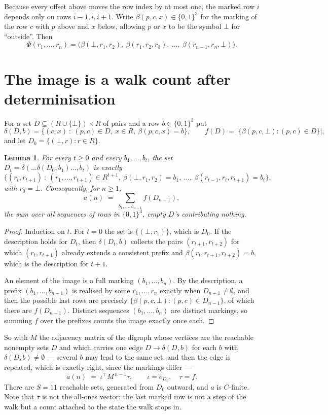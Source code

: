 \documentclass[11pt,a4paper]{article}
\theoremstyle{plain}
\newtheorem{lemma}[theorem]{Lemma}
\theoremstyle{definition}
\begin{document}
Because every offset above moves the row index by at most one, the marked row $i$ depends only
on rows $i-1,i,i+1$. Write $\beta(p,c,x)\in\{0,1\}^{3}$ for the marking of the row $c$
with $p$ above and $x$ below, allowing $p$ or $x$ to be the symbol $\bot$ for ``outside''.
Then
\[
\Phi(r_1,\dots,r_n)=\bigl(\beta(\bot,r_1,r_2),\ \beta(r_1,r_2,r_3),\ \dots,\
\beta(r_{n-1},r_n,\bot)\bigr).
\]

\section{The image is a walk count after determinisation}

For a set $D\subseteq(R\cup\{\bot\})\times R$ of pairs and a row $b\in\{0,1\}^{3}$ put
\[
\delta(D,b)=\{(c,x)\ :\ (p,c)\in D,\ x\in R,\ \beta(p,c,x)=b\},\qquad
f(D)=\bigl|\{\beta(p,c,\bot):(p,c)\in D\}\bigr| ,
\]
and let $D_0=\{(\bot,r):r\in R\}$.

\begin{lemma}\label{lem:det}
For every $t\ge0$ and every $b_1,\dots,b_t$, the set
$D_t=\delta(\dots\delta(D_0,b_1)\dots,b_t)$ is exactly
\[
\{(r_t,r_{t+1})\ :\ (r_1,\dots,r_{t+1})\in R^{t+1},\ \beta(\bot,r_1,r_2)=b_1,\ \dots,\
\beta(r_{t-1},r_t,r_{t+1})=b_t\} ,
\]
with $r_0=\bot$. Consequently, for $n\ge1$,
\[
a(n)\;=\;\sum_{b_1,\dots,b_{n-1}}f(D_{n-1}),
\]
the sum over all sequences of rows in $\{0,1\}^{3}$, empty $D$'s contributing nothing.
\end{lemma}

\begin{proof}
Induction on $t$. For $t=0$ the set is $\{(\bot,r_1)\}$, which is $D_0$. If the description
holds for $D_t$, then $\delta(D_t,b)$ collects the pairs $(r_{t+1},r_{t+2})$ for which
$(r_t,r_{t+1})$ already extends a consistent prefix and
$\beta(r_t,r_{t+1},r_{t+2})=b$, which is the description for $t+1$.

An element of the image is a full marking $(b_1,\dots,b_n)$. By the description, a prefix
$(b_1,\dots,b_{n-1})$ is realised by some $r_1,\dots,r_n$ exactly when $D_{n-1}\neq
\emptyset$, and then the possible last rows are precisely
$\{\beta(p,c,\bot):(p,c)\in D_{n-1}\}$, of which there are $f(D_{n-1})$. Distinct
sequences $(b_1,\dots,b_n)$ are distinct markings, so summing $f$ over the prefixes counts the
image exactly once each.
\end{proof}

So with $M$ the adjacency matrix of the digraph whose vertices are the reachable nonempty sets
$D$ and which carries one edge $D\to\delta(D,b)$ for each $b$ with $\delta(D,b)\neq\emptyset$
--- several $b$ may lead to the same set, and then the edge is repeated, which is exactly
right, since the markings differ ---
\[
a(n)\;=\;\iota^{\!\top}M^{\,n-1}\tau,\qquad \iota=e_{D_0},\quad \tau=f .
\]
There are $S=11$ reachable sets, generated from $D_0$ outward, and $a$ is $C$-finite. Note
that $\tau$ is not the all-ones vector: the last marked row is not a step of the walk but a
count attached to the state the walk stops in.
\end{document}
